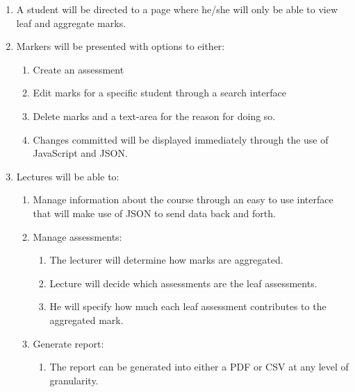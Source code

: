 \documentclass{article}
\begin{document}
\begin{enumerate}
\item  A student will be directed to a page where he/she will only be able to view leaf and aggregate marks. 

\item  Markers will be presented with options to either:  

\begin{enumerate}
\item  Create an assessment 

\item  Edit marks for a specific student through a search interface 

\item  Delete marks and a text-area for the reason for doing so. 

\item  Changes committed will be displayed immediately through the use of JavaScript and JSON. 
\end{enumerate}

\item  Lectures will be able to:  

\begin{enumerate}
\item  Manage information about the course through an easy to use interface that will make use of JSON to send data back and forth. 

\item  Manage assessments:  

\begin{enumerate}
\item  The lecturer will determine how marks are aggregated. 

\item  Lecture will decide which assessments are the leaf assessments. 

\item  He will specify how much each leaf assessment contributes to the aggregated mark. 
\end{enumerate}

\item  Generate report:

\begin{enumerate}
\item  The report can be generated into either a PDF or CSV at any level of granularity. 
\end{enumerate}
\end{enumerate}
\end{enumerate}
\end{document}
